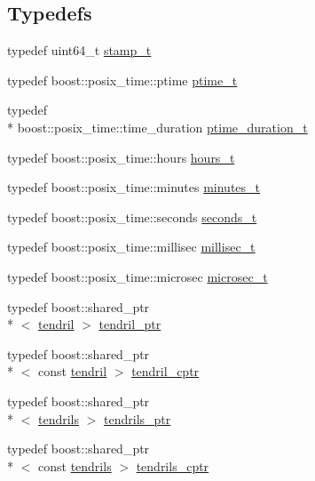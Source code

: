 \subsection*{Typedefs}
\begin{DoxyCompactItemize}
\item 
typedef uint64\-\_\-t \hyperlink{namespaceecto_a96ba8fa498cc4b8e2a0217a9e236b50d}{stamp\-\_\-t}
\item 
typedef boost\-::posix\-\_\-time\-::ptime \hyperlink{namespaceecto_a5bbe8fb0da047cb18d92eb9dfb469652}{ptime\-\_\-t}
\item 
typedef \\*
boost\-::posix\-\_\-time\-::time\-\_\-duration \hyperlink{namespaceecto_a0952d5ebd059cbd79b978ecab9ec781c}{ptime\-\_\-duration\-\_\-t}
\item 
typedef boost\-::posix\-\_\-time\-::hours \hyperlink{namespaceecto_a477c167c1e1288b689db5872f650540e}{hours\-\_\-t}
\item 
typedef boost\-::posix\-\_\-time\-::minutes \hyperlink{namespaceecto_ad57e5ebf1455dd895ce11804e47669e5}{minutes\-\_\-t}
\item 
typedef boost\-::posix\-\_\-time\-::seconds \hyperlink{namespaceecto_ae14f91b3661ad9cb774590b15407742c}{seconds\-\_\-t}
\item 
typedef boost\-::posix\-\_\-time\-::millisec \hyperlink{namespaceecto_ab1f4721cc3b311f9615b3092d291260b}{millisec\-\_\-t}
\item 
typedef boost\-::posix\-\_\-time\-::microsec \hyperlink{namespaceecto_affe36dc8be6d20a6b8f7359655c8dc23}{microsec\-\_\-t}
\item 
typedef boost\-::shared\-\_\-ptr\\*
$<$ \hyperlink{classecto_1_1tendril}{tendril} $>$ \hyperlink{namespaceecto_a84fb5f6130275382e5cbeb5fdececa78}{tendril\-\_\-ptr}
\item 
typedef boost\-::shared\-\_\-ptr\\*
$<$ const \hyperlink{classecto_1_1tendril}{tendril} $>$ \hyperlink{namespaceecto_ad01f26ee47597f71a6f86ee34bb3ffe4}{tendril\-\_\-cptr}
\item 
typedef boost\-::shared\-\_\-ptr\\*
$<$ \hyperlink{classecto_1_1tendrils}{tendrils} $>$ \hyperlink{namespaceecto_a89953a225525948cb71d5488c3c6472b}{tendrils\-\_\-ptr}
\item 
typedef boost\-::shared\-\_\-ptr\\*
$<$ const \hyperlink{classecto_1_1tendrils}{tendrils} $>$ \hyperlink{namespaceecto_a6165b23b34082cfc17104ca7e9f1b212}{tendrils\-\_\-cptr}

\end{DoxyCompactItemize}

